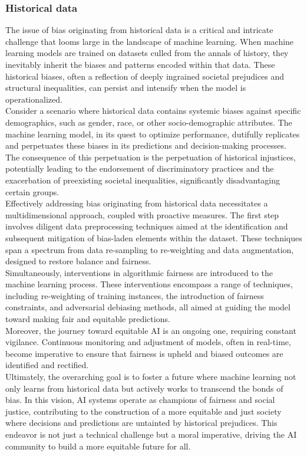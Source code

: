 \documentclass[12pt,a4paper,openright,twoside]{book}
\begin{document}
\subsubsection{Historical data} 
The issue of bias originating from historical data is a critical and intricate challenge that looms large in the landscape of machine learning. When machine learning models are trained on datasets culled from the annals of history, they inevitably inherit the biases and patterns encoded within that data. These historical biases, often a reflection of deeply ingrained societal prejudices and structural inequalities, can persist and intensify when the model is operationalized. \cite{10.1145/3308560.3317590}\\
Consider a scenario where historical data contains systemic biases against specific demographics, such as gender, race, or other socio-demographic attributes. The machine learning model, in its quest to optimize performance, dutifully replicates and perpetuates these biases in its predictions and decision-making processes. The consequence of this perpetuation is the perpetuation of historical injustices, potentially leading to the endorsement of discriminatory practices and the exacerbation of preexisting societal inequalities, significantly disadvantaging certain groups. \\
Effectively addressing bias originating from historical data necessitates a multidimensional approach, coupled with proactive measures. The first step involves diligent data preprocessing techniques aimed at the identification and subsequent mitigation of bias-laden elements within the dataset. These techniques span a spectrum from data re-sampling to re-weighting and data augmentation, designed to restore balance and fairness. \\
Simultaneously, interventions in algorithmic fairness are introduced to the machine learning process. These interventions encompass a range of techniques, including re-weighting of training instances, the introduction of fairness constraints, and adversarial debiasing methods, all aimed at guiding the model toward making fair and equitable predictions. \\
Moreover, the journey toward equitable AI is an ongoing one, requiring constant vigilance. Continuous monitoring and adjustment of models, often in real-time, become imperative to ensure that fairness is upheld and biased outcomes are identified and rectified. \\
Ultimately, the overarching goal is to foster a future where machine learning not only learns from historical data but actively works to transcend the bonds of bias. In this vision, AI systems operate as champions of fairness and social justice, contributing to the construction of a more equitable and just society where decisions and predictions are untainted by historical prejudices. This endeavor is not just a technical challenge but a moral imperative, driving the AI community to build a more equitable future for all.
\end{document}
